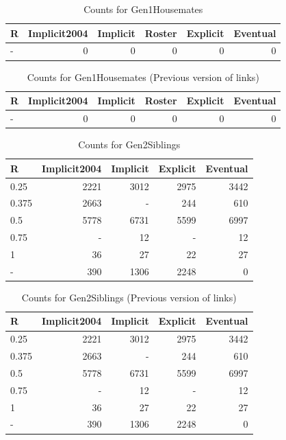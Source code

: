 \documentclass[a4paper]{article}\usepackage[]{graphicx}\usepackage[]{color}
\begin{document}
\begin{table}[ht]
\centering
\begingroup\large
\begin{tabular}{lrrrrr}
  \hline
R & Implicit2004 & Implicit & Roster & Explicit & Eventual \\ 
  \hline
- &   0 &   0 &   0 &   0 &   0 \\ 
   \hline
\end{tabular}
\endgroup
\caption{Counts for Gen1Housemates} 
\end{table}
\begin{table}[ht]
\centering
\begingroup\large
\begin{tabular}{lrrrrr}
  \hline
R & Implicit2004 & Implicit & Roster & Explicit & Eventual \\ 
  \hline
- &   0 &   0 &   0 &   0 &   0 \\ 
   \hline
\end{tabular}
\endgroup
\caption{Counts for Gen1Housemates (Previous version of links)} 
\end{table}
\begin{table}[ht]
\centering
\begingroup\large
\begin{tabular}{lrrrr}
  \hline
R & Implicit2004 & Implicit & Explicit & Eventual \\ 
  \hline
0.25 & 2221 & 3012 & 2975 & 3442 \\ 
  0.375 & 2663 & - & 244 & 610 \\ 
  0.5 & 5778 & 6731 & 5599 & 6997 \\ 
  0.75 & - &  12 & - &  12 \\ 
  1 &  36 &  27 &  22 &  27 \\ 
  - & 390 & 1306 & 2248 &   0 \\ 
   \hline
\end{tabular}
\endgroup
\caption{Counts for Gen2Siblings} 
\end{table}
\begin{table}[ht]
\centering
\begingroup\large
\begin{tabular}{lrrrr}
  \hline
R & Implicit2004 & Implicit & Explicit & Eventual \\ 
  \hline
0.25 & 2221 & 3012 & 2975 & 3442 \\ 
  0.375 & 2663 & - & 244 & 610 \\ 
  0.5 & 5778 & 6731 & 5599 & 6997 \\ 
  0.75 & - &  12 & - &  12 \\ 
  1 &  36 &  27 &  22 &  27 \\ 
  - & 390 & 1306 & 2248 &   0 \\ 
   \hline
\end{tabular}
\endgroup
\caption{Counts for Gen2Siblings (Previous version of links)} 
\end{table}
\end{document}
